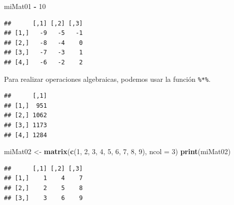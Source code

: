 \documentclass[
]{book}
\newenvironment{Shaded}{\begin{snugshade}}{\end{snugshade}}
\newcommand{\CommentTok}[1]{\textcolor[rgb]{0.56,0.35,0.01}{\textit{#1}}}
\newcommand{\DataTypeTok}[1]{\textcolor[rgb]{0.13,0.29,0.53}{#1}}
\newcommand{\DecValTok}[1]{\textcolor[rgb]{0.00,0.00,0.81}{#1}}
\newcommand{\KeywordTok}[1]{\textcolor[rgb]{0.13,0.29,0.53}{\textbf{#1}}}
\newcommand{\NormalTok}[1]{#1}
\newcommand{\OperatorTok}[1]{\textcolor[rgb]{0.81,0.36,0.00}{\textbf{#1}}}
\newcommand{\StringTok}[1]{\textcolor[rgb]{0.31,0.60,0.02}{#1}}
\begin{document}
\begin{Shaded}
\begin{Highlighting}[]
\NormalTok{miMat01 }\OperatorTok{-}\StringTok{ }\DecValTok{10}
\end{Highlighting}
\end{Shaded}

\begin{verbatim}
##      [,1] [,2] [,3]
## [1,]   -9   -5   -1
## [2,]   -8   -4    0
## [3,]   -7   -3    1
## [4,]   -6   -2    2
\end{verbatim}

Para realizar operaciones algebraicas, podemos usar la función \texttt{\%*\%}.

\begin{Shaded}
\end{Shaded}

\begin{verbatim}
##      [,1]
## [1,]  951
## [2,] 1062
## [3,] 1173
## [4,] 1284
\end{verbatim}

\begin{Shaded}
\begin{Highlighting}[]
\NormalTok{miMat02 <-}\StringTok{ }\KeywordTok{matrix}\NormalTok{(}\KeywordTok{c}\NormalTok{(}\DecValTok{1}\NormalTok{, }\DecValTok{2}\NormalTok{, }\DecValTok{3}\NormalTok{, }\DecValTok{4}\NormalTok{, }\DecValTok{5}\NormalTok{, }\DecValTok{6}\NormalTok{, }\DecValTok{7}\NormalTok{, }\DecValTok{8}\NormalTok{, }\DecValTok{9}\NormalTok{), }\DataTypeTok{ncol =} \DecValTok{3}\NormalTok{)}
\KeywordTok{print}\NormalTok{(miMat02)}
\end{Highlighting}
\end{Shaded}

\begin{verbatim}
##      [,1] [,2] [,3]
## [1,]    1    4    7
## [2,]    2    5    8
## [3,]    3    6    9
\end{verbatim}

\begin{Shaded}
\end{Shaded}
\end{document}

